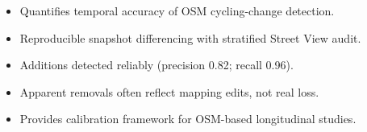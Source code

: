 \documentclass[
]{article}
\author{}
\date{}
\providecommand{\tightlist}{%
  \setlength{\itemsep}{0pt}\setlength{\parskip}{0pt}}
\begin{document}
\begin{itemize}
\tightlist
\item
  Quantifies temporal accuracy of OSM cycling-change detection.
\item
  Reproducible snapshot differencing with stratified Street View audit.
\item
  Additions detected reliably (precision 0.82; recall 0.96).
\item
  Apparent removals often reflect mapping edits, not real loss.
\item
  Provides calibration framework for OSM-based longitudinal studies.
\end{itemize}
\end{document}
